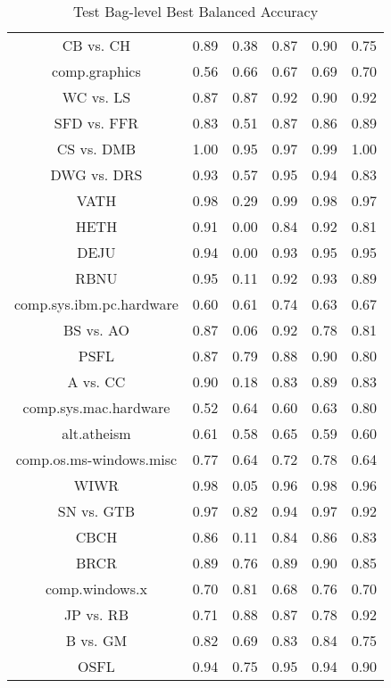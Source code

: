 \begin{table}[ht]\footnotesize
\centering
\caption{Test Bag-level Best Balanced Accuracy}
\label{Table:mil_test_bag_best_balanced_accuracy}
\begin{tabular}{|c|c|c|c|c|c|}
  \hline
          &\MIB{}  &  \rB{}  &  \MB{}  &  \AB{}  &  \AuerB{}\\ 
  \hline
CB vs. CH  &  0.89   &  0.38   &  0.87   &  0.90   &  0.75 \\ 
comp.graphics  &  0.56   &  0.66   &  0.67   &  0.69   &  0.70 \\ 
WC vs. LS  &  0.87   &  0.87   &  0.92   &  0.90   &  0.92 \\ 
SFD vs. FFR  &  0.83   &  0.51   &  0.87   &  0.86   &  0.89 \\ 
CS vs. DMB  &  1.00   &  0.95   &  0.97   &  0.99   &  1.00 \\ 
DWG vs. DRS  &  0.93   &  0.57   &  0.95   &  0.94   &  0.83 \\ 
VATH  &  0.98   &  0.29   &  0.99   &  0.98   &  0.97 \\ 
HETH  &  0.91   &  0.00   &  0.84   &  0.92   &  0.81 \\ 
DEJU  &  0.94   &  0.00   &  0.93   &  0.95   &  0.95 \\ 
RBNU  &  0.95   &  0.11   &  0.92   &  0.93   &  0.89 \\ 
comp.sys.ibm.pc.hardware  &  0.60   &  0.61   &  0.74   &  0.63   &  0.67 \\ 
BS vs. AO  &  0.87   &  0.06   &  0.92   &  0.78   &  0.81 \\ 
PSFL  &  0.87   &  0.79   &  0.88   &  0.90   &  0.80 \\ 
A vs. CC  &  0.90   &  0.18   &  0.83   &  0.89   &  0.83 \\ 
comp.sys.mac.hardware  &  0.52   &  0.64   &  0.60   &  0.63   &  0.80 \\ 
alt.atheism  &  0.61   &  0.58   &  0.65   &  0.59   &  0.60 \\ 
comp.os.ms-windows.misc  &  0.77   &  0.64   &  0.72   &  0.78   &  0.64 \\ 
WIWR  &  0.98   &  0.05   &  0.96   &  0.98   &  0.96 \\ 
SN vs. GTB  &  0.97   &  0.82   &  0.94   &  0.97   &  0.92 \\ 
CBCH  &  0.86   &  0.11   &  0.84   &  0.86   &  0.83 \\ 
BRCR  &  0.89   &  0.76   &  0.89   &  0.90   &  0.85 \\ 
comp.windows.x  &  0.70   &  0.81   &  0.68   &  0.76   &  0.70 \\ 
JP vs. RB  &  0.71   &  0.88   &  0.87   &  0.78   &  0.92 \\ 
B vs. GM  &  0.82   &  0.69   &  0.83   &  0.84   &  0.75 \\ 
OSFL  &  0.94   &  0.75   &  0.95   &  0.94   &  0.90 \\ 
\hline
 \end{tabular}
  \end{table}


